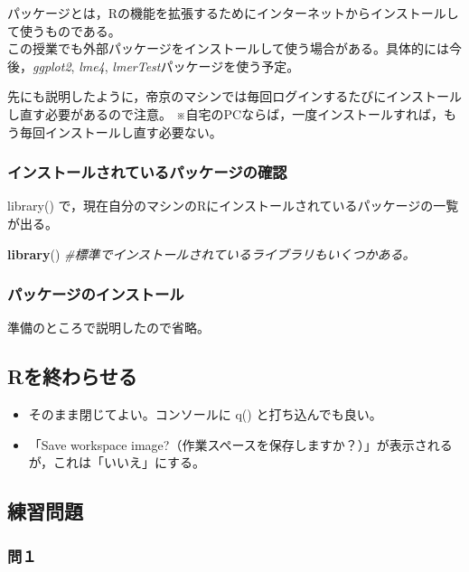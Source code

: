 \documentclass[]{article}
\newenvironment{Shaded}{\begin{snugshade}}{\end{snugshade}}
\newcommand{\KeywordTok}[1]{\textcolor[rgb]{0.13,0.29,0.53}{\textbf{#1}}}
\newcommand{\CommentTok}[1]{\textcolor[rgb]{0.56,0.35,0.01}{\textit{#1}}}
\newcommand{\NormalTok}[1]{#1}
\providecommand{\tightlist}{%
  \setlength{\itemsep}{0pt}\setlength{\parskip}{0pt}}
\begin{document}
パッケージとは，Rの機能を拡張するためにインターネットからインストールして使うものである。\\
この授業でも外部パッケージをインストールして使う場合がある。具体的には今後，\emph{ggplot2},
\emph{lme4}, \emph{lmerTest}パッケージを使う予定。

先にも説明したように，帝京のマシンでは毎回ログインするたびにインストールし直す必要があるので注意。
※自宅のPCならば，一度インストールすれば，もう毎回インストールし直す必要ない。

\subsubsection{インストールされているパッケージの確認}

library()
で，現在自分のマシンのRにインストールされているパッケージの一覧が出る。

\begin{Shaded}
\begin{Highlighting}[]
\KeywordTok{library}\NormalTok{() }\CommentTok{#標準でインストールされているライブラリもいくつかある。}
\end{Highlighting}
\end{Shaded}

\subsubsection{パッケージのインストール}

準備のところで説明したので省略。

\subsection{Rを終わらせる}\label{r}

\begin{itemize}
\tightlist
\item
  そのまま閉じてよい。コンソールに q() と打ち込んでも良い。\\
\item
  「Save workspace
  image?（作業スペースを保存しますか？）」が表示されるが，これは「いいえ」にする。
\end{itemize}

\subsection{練習問題}\label{-1}

\subsubsection{問１}
\end{document}
